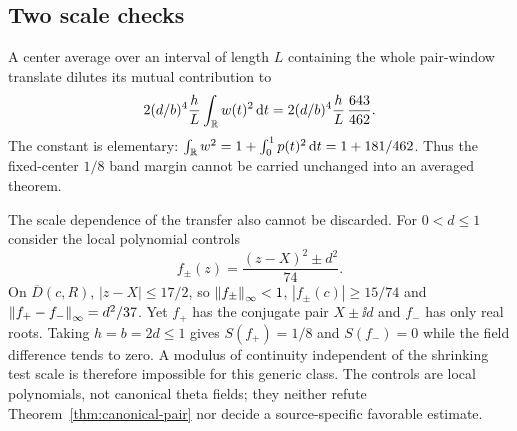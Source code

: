 \subsection{Two scale checks}

A center average over an interval of length $L$ containing the
whole pair-window translate dilutes its mutual contribution to
\[
 2(d/b)^4\frac{h}{L}\int_\mathbb R w(t)^2\,\mathrm d t
 =2(d/b)^4\frac{h}{L}\,\frac{643}{462}.
\]
The constant is elementary:
$\int_\mathbb R w^2=1+\int_0^1p(t)^2\,\mathrm d t=1+181/462$.
Thus the fixed-center $1/8$ band margin cannot be carried
unchanged into an averaged theorem.

The scale dependence of the transfer also cannot be discarded.
For $0<d\le1$ consider the local polynomial controls
\begin{equation}\label{eq:pair-control}
 f_\pm(z)=\frac{(z-X)^2\pm d^2}{74}.
\end{equation}
On $\overline D(c,R)$, $|z-X|\le17/2$, so
$\left\|f_\pm\right\|_\infty<1$,
$|f_\pm(c)|\ge15/74$ and
$\left\|f_+-f_-\right\|_\infty=d^2/37$.
Yet $f_+$ has the conjugate pair $X\pm\ii d$ and $f_-$ has
only real roots. Taking $h=b=2d\le1$ gives
$S(f_+)=1/8$ and $S(f_-)=0$ while the field difference tends
to zero. A modulus of continuity independent of the shrinking
test scale is therefore impossible for this generic class.
The controls are local polynomials, not canonical theta fields;
they neither refute Theorem~\ref{thm:canonical-pair} nor decide
a source-specific favorable estimate.
